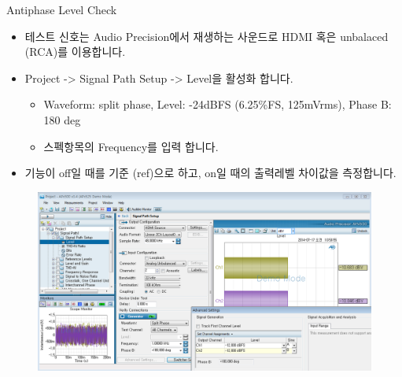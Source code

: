 \documentclass{beamer}
\begin{document}
\begin{frame}[t]{Antiphase Level Check}
\begin{itemize}
\item 테스트 신호는 Audio Precision에서 재생하는 사운드로 HDMI 혹은 unbalaced (RCA)를 이용합니다.
\item Project -> Signal Path Setup -> Level을 활성화 합니다.
	\begin{itemize}
	\item Waveform: split phase, Level: -24dBFS (6.25\%FS, 125mVrms), Phase B: 180 deg
	\item 스펙항목의 Frequency를 입력 합니다.
	\end{itemize}
\item 기능이 off일 때를 기준 (ref)으로 하고, on일 때의 출력레벨 차이값을 측정합니다.
\end{itemize}

\begin{figure}[r]
\includegraphics[height=0.4\textwidth]{figure/apsetting/antiphaseLevel.png}
\end{figure}
\end{frame}
\end{document}

